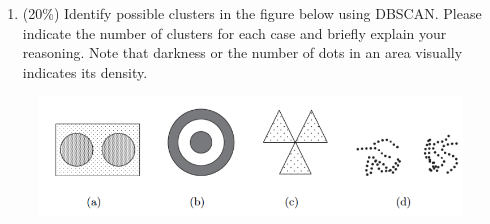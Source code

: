 \documentclass[11pt]{article}
\makeatletter
\def\maxwidth{\ifdim\Gin@nat@width>\linewidth\linewidth
    \else\Gin@nat@width\fi}
\let\Oldincludegraphics\includegraphics
\renewcommand{\includegraphics}[1]{\Oldincludegraphics[width=.8\maxwidth]{#1}}
\providecommand{\tightlist}{%
      \setlength{\itemsep}{0pt}\setlength{\parskip}{0pt}}
\makeatother
\begin{document}
\begin{enumerate}
\def\labelenumi{\arabic{enumi}.}
\setcounter{enumi}{2}
\tightlist
\item
  (20\%) Identify possible clusters in the figure below using DBSCAN.
  Please indicate the number of clusters for each case and briefly
  explain your reasoning. Note that darkness or the number of dots in an
  area visually indicates its density.
\end{enumerate}

\begin{figure}[H]
\centering
\includegraphics{3.png}
\caption{}
\end{figure}
\end{document}
